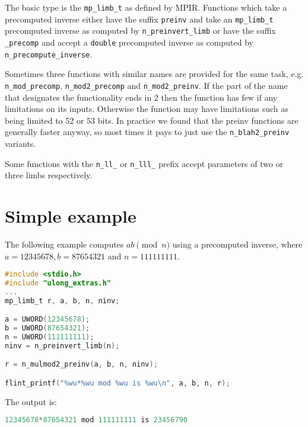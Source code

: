 \documentclass[a4paper,10pt]{book}
\newcommand{\code}{\lstinline}
\begin{document}
{{The basic type is the \code{mp_limb_t} as defined by MPIR. Functions
which take a precomputed inverse either have the suffix \code{preinv}
and take an \code{mp_limb_t} precomputed inverse as computed by
\code{n_preinvert_limb} or have the suffix \code{_precomp} and accept
a \code{double} precomputed inverse as computed by
\code{n_precompute_inverse}.

Sometimes three functions with similar names are provided for the
same task, e.g. \code{n_mod_precomp}, \code{n_mod2_precomp} and
\code{n_mod2_preinv}. If the part of the name that designates the
functionality ends in 2 then the function has few if any limitations
on its inputs. Otherwise the function may have limitations such as
being limited to 52 or 53 bits. In practice we found that the
preinv functions are generally faster anyway, so most times it pays
to just use the \code{n_blah2_preinv} variants.

Some functions with the \code{n_ll_} or \code{n_lll_} prefix accept
parameters of two or three limbs respectively.

\section{Simple example}

The following example computes $ab \pmod{n}$ using a precomputed
inverse, where $a = 12345678, b = 87654321$ and $n = 111111111$.

\begin{lstlisting}[language=c]
#include <stdio.h>
#include "ulong_extras.h"
...
mp_limb_t r, a, b, n, ninv;

a = UWORD(12345678);
b = UWORD(87654321);
n = UWORD(111111111);
ninv = n_preinvert_limb(n);

r = n_mulmod2_preinv(a, b, n, ninv);

flint_printf("%wu*%wu mod %wu is %wu\n", a, b, n, r);
\end{lstlisting}

The output is:
\begin{lstlisting}[language=c]
12345678*87654321 mod 111111111 is 23456790
\end{lstlisting}




}}
\end{document}

